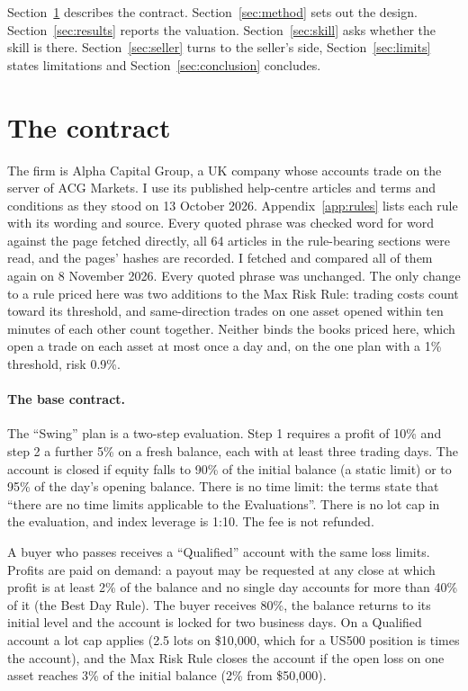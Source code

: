 \documentclass[11pt]{article}
\begin{document}
Section~\ref{sec:contract} describes the contract. Section~\ref{sec:method} sets out the design.
Section~\ref{sec:results} reports the valuation. Section~\ref{sec:skill} asks whether the skill is there.
Section~\ref{sec:seller} turns to the seller's side, Section~\ref{sec:limits} states limitations and
Section~\ref{sec:conclusion} concludes.

\section{The contract}\label{sec:contract}
The firm is Alpha Capital Group, a UK company whose accounts trade on the server of ACG Markets. I use its
published help-centre articles and terms and conditions as they stood on 13 October 2026. Appendix~\ref{app:rules}
lists each rule with its wording and source. Every quoted phrase was checked word for word against the page
fetched directly, all 64 articles in the rule-bearing sections were read, and the pages' hashes are recorded. I
fetched and compared all of them again on 8 November 2026. Every quoted phrase was unchanged. The only change to a
rule priced here was two additions to the Max Risk Rule: trading costs count toward its threshold, and
same-direction trades on one asset opened within ten minutes of each other count together. Neither binds the books
priced here, which open a trade on each asset at most once a day and, on the one plan with a 1\% threshold, risk
0.9\%.

\paragraph{The base contract.} The ``Swing'' plan is a two-step evaluation. Step 1 requires a profit of 10\% and
step 2 a further 5\% on a fresh balance, each with at least three trading days. The account is closed if equity
falls to 90\% of the initial balance (a static limit) or to 95\% of the day's opening balance. There is no time
limit: the terms state that ``there are no time limits applicable to the Evaluations''. There is no lot cap in the
evaluation, and index leverage is 1:10. The fee is not refunded.

A buyer who passes receives a ``Qualified'' account with the same loss limits. Profits are paid on demand: a
payout may be requested at any close at which profit is at least 2\% of the balance and no single day accounts
for more than 40\% of it (the Best Day Rule). The buyer receives 80\%, the balance returns to its initial level
and the account is locked for two business days. On a Qualified account a lot cap applies (2.5 lots on \$10,000,
which for a US500 position is \Lam{} times the account), and the Max Risk Rule closes the account if the open
loss on one asset reaches 3\% of the initial balance (2\% from \$50,000).
\end{document}
